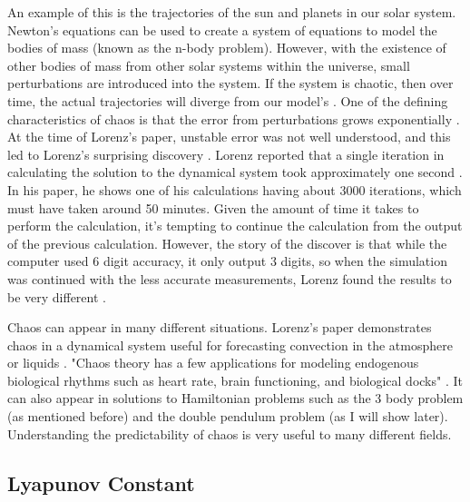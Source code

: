 \documentclass{article}
\begin{document}
An example of this is the trajectories of the sun and planets in our solar
system. Newton's equations can be used to create a system of equations to
model the bodies of mass (known as the n-body problem). However, with the
existence of other bodies of mass from other solar systems within the
universe, small perturbations are introduced into the system. If the system
is chaotic, then over time, the actual trajectories will diverge from our
model's \cite{oestreicher2007history}.
One of the defining characteristics of chaos is that the error from
perturbations grows exponentially \cite{oestreicher2007history}. At the time
of Lorenz's paper, unstable error was not well understood, and this led to
Lorenz's surprising discovery \cite{oestreicher2007history}. Lorenz reported
that a single iteration in calculating the solution to the dynamical system
took approximately one second \cite{lorenz1963deterministic}. In his paper,
he shows one of his calculations having about 3000 iterations, which must
have taken around 50 minutes. Given the amount of time it takes to perform
the calculation, it's tempting to continue the calculation from the output of
the previous calculation. However, the story of the discover is that while
the computer used 6 digit accuracy, it only output 3 digits, so when the
simulation was continued with the less accurate measurements, Lorenz
found the results to be very different \cite{oestreicher2007history}.

Chaos can appear in many different situations. Lorenz's paper demonstrates
chaos in a dynamical system useful for forecasting convection in the
atmosphere or liquids \cite{lorenz1963deterministic}. "Chaos theory has a few
applications for modeling endogenous biological rhythms such as heart rate,
brain functioning, and biological docks" \cite{oestreicher2007history}. It
can also appear in solutions to Hamiltonian problems such as the 3 body
problem (as mentioned before) and the double pendulum problem (as I will show
later). Understanding the predictability of chaos is very useful to many
different fields.

\subsection{Lyapunov Constant}
\end{document}

